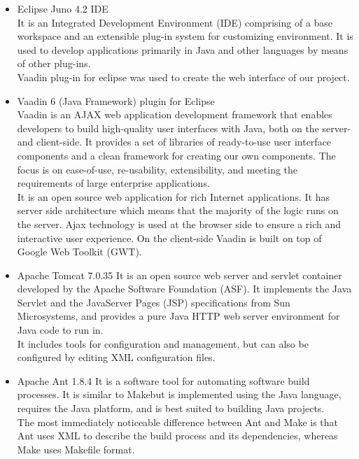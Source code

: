 \documentclass[12pt]{article}
\begin{document}
\begin{itemize}
\item Eclipse Juno 4.2 IDE \\
It is an Integrated Development Environment (IDE) comprising of a base workspace and an extensible plug-in system for customizing environment. It is used to develop applications primarily in Java and other languages by means of other plug-ins.\\
Vaadin plug-in for eclipse was used to create the web interface of our project.

\item Vaadin 6 (Java Framework) plugin for Eclipse \\
Vaadin is an AJAX web application development framework that enables developers to build high-quality user interfaces with Java, both on the server- and client-side. It provides a set of libraries of ready-to-use user interface components and a clean framework for creating our own components. The focus is on ease-of-use, re-usability, extensibility, and meeting the requirements of large enterprise applications.\\
It is an open source web application for rich Internet applications. It has server side architecture which means that the majority of the logic runs on the server. Ajax technology is used at the browser side to ensure a rich and interactive user experience. On the client-side Vaadin is built on top of Google Web Toolkit (GWT).\\

\item Apache Tomcat 7.0.35
It is an open source web server and servlet container developed by the Apache Software Foundation (ASF). It implements the Java Servlet and the JavaServer Pages (JSP) specifications from Sun Microsystems, and provides a pure Java HTTP web server environment for Java code to run in. \\
It includes tools for configuration and management, but can also be configured by editing XML configuration files.

\item Apache Ant 1.8.4
It is a software tool for automating software build processes. It is similar to \textgravedbl Make\textasciidieresis but is implemented using the Java language, requires the Java platform, and is best suited to building Java projects.\\
The most immediately noticeable difference between Ant and Make is that Ant uses XML to describe the build process and its dependencies, whereas Make uses Makefile format.


\end{itemize}
\end{document}

